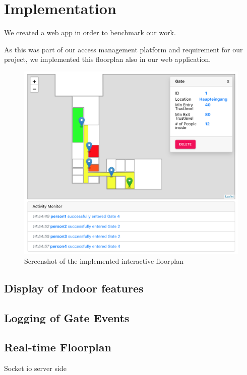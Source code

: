 \chapter{Implementation}

We created a web app in order to benchmark our work.

As this was part of our access management platform and requirement for our project, we implemented this floorplan also in our web application.

\begin{figure}[!hb]
	\centering
	\includegraphics[width=0.9\linewidth]{images/FloorplanScreenshot}
	\caption{Screenshot of the implemented interactive floorplan}
	\label{fig:FloorplanScreenshot}
\end{figure}

\section{Display of Indoor features}
\label{Display of Indoor features}

\section{Logging of Gate Events}
\label{Logging of Gate Events}

\section{Real-time Floorplan}
\label{Real-time Floorplan}

Socket io server side

